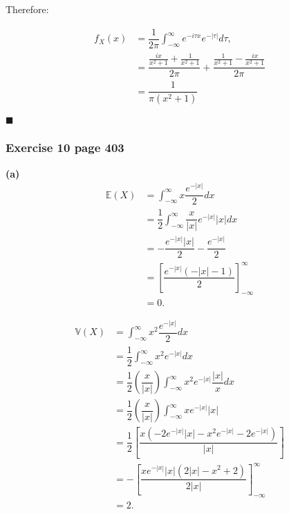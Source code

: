 \documentclass[10pt,leter,openany]{article}
\begin{document}
			Therefore:
			
				\begin{equation*}
				\begin{aligned}
					f_{X}(x) & = \dfrac{1}{2\pi}\int_{-\infty}^{\infty}  e^{-i\tau x} e^{-|\tau|} d\tau, \\
					& =  \dfrac{\frac{ix}{x^{2}+1}+\frac{1}{x^{2}+1}}{ 2\pi} +  \dfrac{\frac{1}{x^{2}+1} - \frac{ix}{x^{2}+1}}{ 2\pi}  \\
					& = \dfrac{1}{\pi (x^{2} + 1) }
				\end{aligned}	
			\end{equation*}
		
						\begin{flushright}
							$\blacksquare $ 
						\end{flushright}
					
		\subsubsection{Exercise 10 page 403}
		
		\textbf{(a)}
			\begin{equation*}
				\begin{aligned}
				\mathbb{E}(X)  & = \int_{-\infty}^{\infty}x\dfrac{e^{-|x|}}{2} dx \\
				& = \dfrac{1}{2}\int_{-\infty}^{\infty}  \dfrac{x}{|x|} e^{-|x|} |x| dx\\
				& = - \dfrac{e^{-|x|} |x|}{2} - \dfrac{e^{-|x|}}{2}\\
				& = \left[ \dfrac{e^{-|x|} (-|x|-1)}{2}\right] _{-\infty}^{\infty}\\
				& = 0.
			\end{aligned}	
			\end{equation*}
		
		
		\begin{equation*}
			\begin{aligned}
				\mathbb{V}(X)  & = \int_{-\infty}^{\infty}x^{2}\dfrac{e^{-|x|}}{2} dx \\
				& = \dfrac{1}{2}\int_{-\infty}^{\infty} x^{2} e^{-|x|} dx\\
				& = \dfrac{1}{2} \left( \dfrac{x}{|x|}\right)  \int_{-\infty}^{\infty} x^{2} e^{-|x|} \dfrac{|x|}{x} dx\\
				& = \dfrac{1}{2} \left( \dfrac{x}{|x|}\right)  \int_{-\infty}^{\infty} x e^{-|x|} |x|\\
				& = \dfrac{1}{2}\left[   \dfrac{x(-2e^{-|x|}|x| - x^{2}e^{-|x|} - 2e^{-|x|}       )}{|x|}      \right] \\
				& = - \left[ \dfrac{xe^{-|x|}|x| ( 2|x| - x^{2} +2      )}{2|x|} \right]_{-\infty}^{\infty}\\
				& = 2.
			\end{aligned}	
		\end{equation*}
\end{document}
